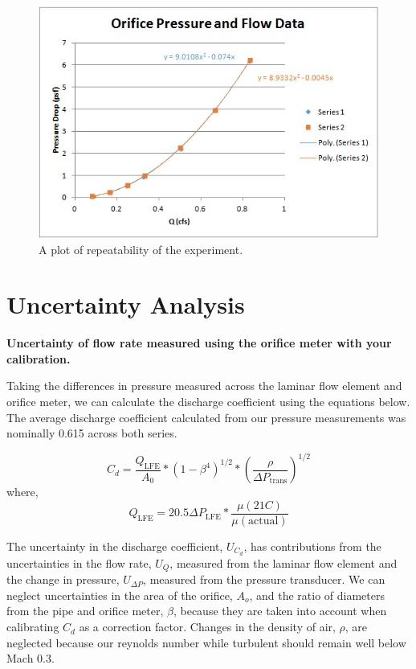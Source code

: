 \documentclass{article}
\begin{document}
  \begin{figure}[!htb]
   \begin{center}
    \includegraphics[width = 12 cm]{figs/Q_dP_fits.jpg}
    \caption{A plot of repeatability of the experiment. }
    \label{orif-zoom}
   \end{center}
  \end{figure}

\newpage
\section{Uncertainty Analysis}

\textbf{Uncertainty of flow rate measured using the orifice meter with
your calibration.} 

Taking the differences in pressure measured across the laminar flow element and orifice meter, 
we can calculate the discharge coefficient using the equations below. The average discharge coefficient 
calculated from our pressure measurements was nominally 0.615 across both series.

\begin{equation}
  C_d = \frac{Q_{\text{LFE}} }{A_0} * (1-\beta^4)^{1/2} * \left(\frac{\rho}{\Delta P_{\text{trans}}}\right)^{1/2}
\end{equation}
where, 
\begin{equation}
  Q_{\text{LFE}} = 20.5 \Delta P_{\text{LFE}} * \frac{\mu(21 C)}{\mu(\text{actual})}
\end{equation}

The uncertainty in the discharge coefficient, $U_{C_d}$, has contributions from the uncertainties in
the flow rate, $U_Q$, measured from the laminar flow element and the change in pressure, $U_{\Delta P}$, 
measured from the pressure transducer. We can neglect uncertainties in the area of the orifice, $A_o$, 
and the ratio of diameters from the pipe and orifice meter, $\beta$, because they are taken into account 
when calibrating $C_d$ as a correction factor. Changes in the density of air, $\rho$, are neglected because our 
reynolds number while turbulent should remain well below Mach 0.3.
\end{document}
